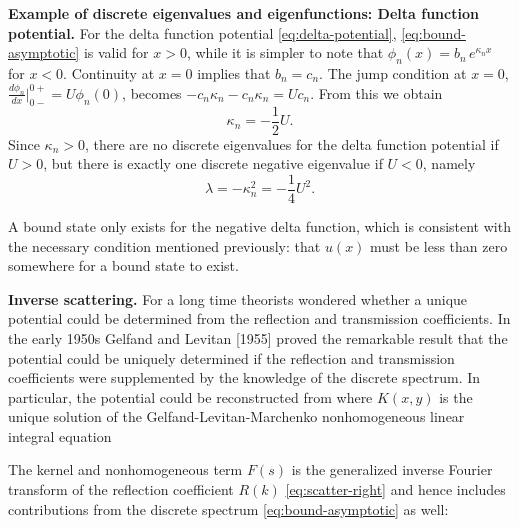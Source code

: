 \textbf{Example of discrete eigenvalues and eigenfunctions: Delta function potential.}  For the delta function potential \eqref{eq:delta-potential}, \eqref{eq:bound-asymptotic} is valid for $x > 0$, while it is simpler to note that $\phi_n(x) = b_n\,e^{\kappa_n x}$ for $x < 0$.  Continuity at $x = 0$ implies that $b_n = c_n$.  The jump condition at $x = 0$, $\frac{d\phi_n}{dx}\big|_{0-}^{0+} = U\phi_n(0)$, becomes $-c_n\kappa_n - c_n\kappa_n = Uc_n$.  From this we obtain
\begin{equation}
\label{eq:delta-kappa}
\kappa_n = -\frac{1}{2}U.
\end{equation}
Since $\kappa_n > 0$, there are no discrete eigenvalues for the delta function potential if $U > 0$, but there is exactly one discrete negative eigenvalue if $U < 0$, namely
\begin{equation}
\label{eq:delta-eigenvalue}
\lambda = -\kappa_n^2 = -\frac{1}{4}U^2.
\end{equation}

A bound state only exists for the negative delta function, which is consistent with the necessary condition mentioned previously: that $u(x)$ must be less than zero somewhere for a bound state to exist.

\textbf{Inverse scattering.}  For a long time theorists wondered whether a unique potential could be determined from the reflection and transmission coefficients.  In the early 1950s Gelfand and Levitan [1955] proved the remarkable result that the potential could be uniquely determined if the reflection and transmission coefficients were supplemented by the knowledge of the discrete spectrum.  In particular, the potential could be reconstructed from
where $K(x,y)$ is the unique solution of the Gelfand-Levitan-Marchenko nonhomogeneous linear integral equation

The kernel and nonhomogeneous term $F(s)$ is the generalized inverse Fourier transform of the reflection coefficient $R(k)$ \eqref{eq:scatter-right} and hence includes contributions from the discrete spectrum \eqref{eq:bound-asymptotic} as well:

